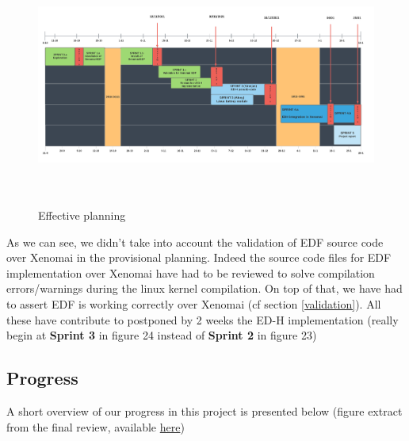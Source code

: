 \documentclass[12pt,hidelinks]{article}
\begin{document}
{     \begin{figure}[!h]
        \hspace{-2.5cm}
        \includegraphics[width=20cm,height=8cm]{PFE - Plannings.png}
        \caption{Effective planning}
    \end{figure} \newline
	
	\newpage
	
	As we can see, we didn't take into account the validation of EDF source code over Xenomai in the provisional planning. Indeed the source code files for EDF implementation over Xenomai have had to be reviewed to solve compilation errors/warnings during the linux kernel compilation. On top of that, we have had to assert EDF is working correctly over Xenomai (cf section \ref{validation}). All these have contribute to postponed by 2 weeks the ED-H implementation (really begin at \textbf{Sprint 3} in figure 24 instead of \textbf{Sprint 2} in figure 23)
	
	\subsection{Progress}
	
	A short overview of our progress in this project is presented below (figure extract from the final review, available \href{https://github.com/skyultime/M2_ERTS_Project_xenomai_edh/tree/dev/Doc/PwpSlides/finalReview}{here})\newline
	
}
\end{document}
